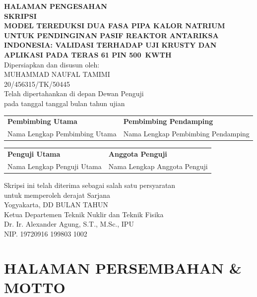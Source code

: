 \documentclass[
  indonesian,
  12pt,
  a4paper,
]{report}
\newcommand{\judul}{MODEL TEREDUKSI DUA FASA PIPA KALOR NATRIUM UNTUK PENDINGINAN PASIF REAKTOR ANTARIKSA INDONESIA: VALIDASI TERHADAP UJI KRUSTY DAN APLIKASI PADA TERAS 61 PIN 500~kWth}
\newcommand{\nama}{Muhammad Naufal Tamimi}
\newcommand{\nim}{20/456315/TK/50445}
\newcommand{\tglujian}{tanggal bulan tahun ujian}
\newcommand{\tglpengesahan}{DD BULAN TAHUN}
\newcommand{\pembimbingutama}{Nama Lengkap Pembimbing Utama}
\newcommand{\pembimbingpendamping}{Nama Lengkap Pembimbing Pendamping}
\newcommand{\pengujiutama}{Nama Lengkap Penguji Utama}
\newcommand{\anggotapenguji}{Nama Lengkap Anggota Penguji}
\newcommand{\ketuadepartemen}{Dr. Ir. Alexander Agung, S.T., M.Sc., IPU}
\newcommand{\nipketua}{19720916 199803 1002}
\begin{document}
\thispagestyle{plain}
\begin{singlespace}
\begin{center}
{\bfseries\MakeUppercase{HALAMAN PENGESAHAN}}\\[0.6cm]
{\bfseries SKRIPSI}\\[0.4cm]
{\bfseries\MakeUppercase{\judul}}\\[0.4cm]
Dipersiapkan dan disusun oleh:\\
\MakeUppercase{\nama}\\
\nim\\[0.4cm]
Telah dipertahankan di depan Dewan Penguji\\
pada tanggal \tglujian\\[0.5cm]
\end{center}
\noindent\begin{tabular}{@{}p{6.2cm}p{6.2cm}@{}}
\textbf{Pembimbing Utama} & \textbf{Pembimbing Pendamping} \\[2.0cm]
\pembimbingutama & \pembimbingpendamping \\
\end{tabular}
\vspace{0.8cm}
\noindent\begin{tabular}{@{}p{6.2cm}p{6.2cm}@{}}
\textbf{Penguji Utama} & \textbf{Anggota Penguji} \\[2.0cm]
\pengujiutama & \anggotapenguji \\
\end{tabular}

\vspace{0.8cm}
\begin{center}
Skripsi ini telah diterima sebagai salah satu persyaratan\\
untuk memperoleh derajat Sarjana\\[0.5cm]
Yogyakarta, \tglpengesahan\\
Ketua Departemen Teknik Nuklir dan Teknik Fisika\\[1.6cm]
\ketuadepartemen\\
NIP. \nipketua
\end{center}
\end{singlespace}
\clearpage

\chapter*{HALAMAN PERSEMBAHAN \& MOTTO}\label{halaman-persembahan-motto}
\end{document}
